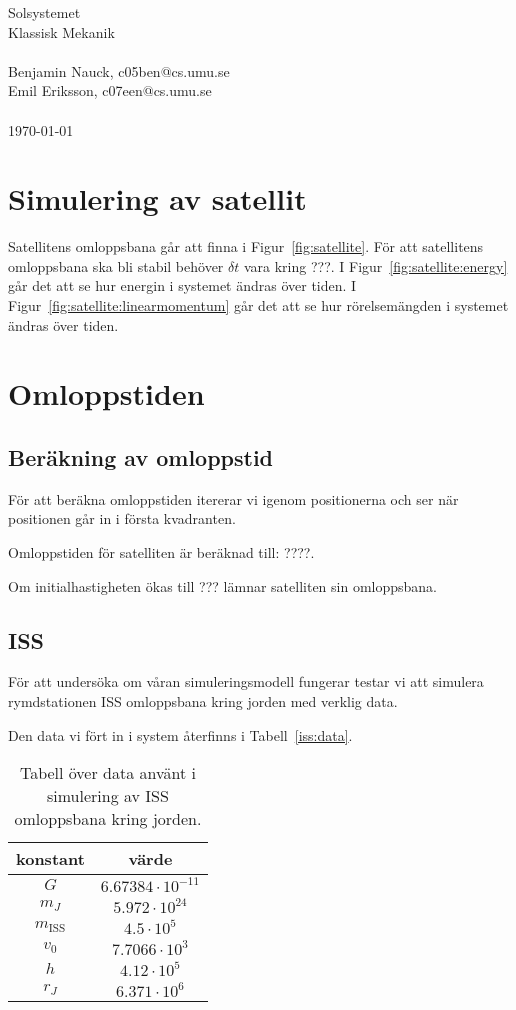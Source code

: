\documentclass[a4]{article}
\begin{document}
{
\Large
Solsystemet\\
Klassisk Mekanik\\
~\\
Benjamin Nauck, c05ben@cs.umu.se\\
Emil Eriksson, c07een@cs.umu.se\\
~\\
\today{}
}
\clearpage

\section{Simulering av satellit}
Satellitens omloppsbana går att finna i Figur~\vref{fig:satellite}.
För att satellitens omloppsbana ska bli stabil behöver $\delta t$ vara kring
???.
I Figur~\vref{fig:satellite:energy} går det att se hur energin i systemet ändras
över tiden.
I Figur~\vref{fig:satellite:linearmomentum} går det att se hur rörelsemängden i
systemet ändras över tiden.


\section{Omloppstiden}
	\subsection{Beräkning av omloppstid}
För att beräkna omloppstiden itererar vi igenom positionerna och ser när
positionen går in i första kvadranten.

Omloppstiden för satelliten är beräknad till: ????.

Om initialhastigheten ökas till ??? lämnar satelliten sin omloppsbana.

	\subsection{ISS}
För att undersöka om våran simuleringsmodell fungerar testar vi att simulera
rymdstationen ISS omloppsbana kring jorden med verklig data.

Den data vi fört in i system återfinns i Tabell~\vref{iss:data}.
\begin{table}
\begin{center}
\begin{tabular}{c|c}
	konstant & värde \\
	\hline
	$G$       &  $6.67384 \cdot 10^{-11}$ \\
	$m_J$     &  $5.972 \cdot 10^{24}$ \\
	$m_{\mathrm{ISS}}$ &  $4.5 \cdot 10^5$ \\
	$v_0$     &  $7.7066 \cdot 10^3$ \\
	$h$       &  $4.12 \cdot 10^5$ \\
	$r_J$     &  $6.371 \cdot 10^6$
\end{tabular}
\caption{Tabell över data använt i simulering av ISS omloppsbana kring jorden.}
\label{iss:data}
\end{center}
\end{table}
\end{document}
